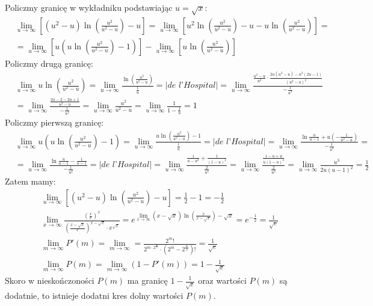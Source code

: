 \documentclass{article}
\begin{document}
Policzmy granicę w wykładniku podstawiając $u = \sqrt{x}$:
\begin{align}
    &\lim_{u\rightarrow \infty} \left[ (u^2-u)\ln{\left(\frac{u^2}{u^2-u}\right)}- u \right] = \lim_{u\rightarrow \infty} \left[ u^2\ln{\left(\frac{u^2}{u^2-u}\right)}- u - u\ln{\left(\frac{u^2}{u^2-u}\right)} \right] = \\
    &= \lim_{u\rightarrow \infty} \left[ u\left(u\ln{\left(\frac{u^2}{u^2-u}\right)}- 1 \right) \right] - \lim_{u\rightarrow \infty} \left[ u\ln{\left(\frac{u^2}{u^2-u}\right)} \right]
\end{align}
Policzmy drugą granicę:
\begin{align}
    &\lim_{u\rightarrow \infty} u\ln{\left(\frac{u^2}{u^2-u}\right)} = \lim_{u\rightarrow \infty} \frac{\ln{\left(\frac{u^2}{u^2-u}\right)}}{\frac{1}{u}} = \bigg| \textit{de l'Hospital} \bigg| = \lim_{u\rightarrow \infty} \frac{\frac{u^2-u}{u^2} \cdot \frac{2u(u^2 - u) - u^2(2u -1)}{(u^2 - u)^2} }{-\frac{1}{u^2}} \\
    &= \lim_{u\rightarrow \infty} \frac{\frac{2u - 2 - 2u +1}{u^2 - u}} {-\frac{1}{u^2}} = \lim_{u\rightarrow \infty} \frac{u^2}{u^2-u} = \lim_{u\rightarrow \infty} \frac{1}{1-\frac{1}{u}} = 1
\end{align}
Policzmy pierwszą granicę:
\begin{align}
    &\lim_{u\rightarrow \infty}  u\left(u\ln{\left(\frac{u^2}{u^2-u}\right)}- 1 \right) = \lim_{u\rightarrow \infty}
    \frac{u\ln{\left(\frac{u^2}{u^2-u}\right)}- 1}{\frac{1}{u}} = \bigg| \textit{de l'Hospital} \bigg| = \lim_{u\rightarrow \infty} \frac{\ln{\frac{u}{u-1}} + u(-\frac{1}{u^2-u})}{-\frac{1}{u^2}} = \\
    &= \lim_{u\rightarrow \infty} \frac{\ln{\frac{u}{u-1}} - \frac{1}{u-1}}{-\frac{1}{u^2}} = \bigg| \textit{de l'Hospital} \bigg| = \lim_{u\rightarrow \infty} \frac{\frac{1}{u-u^2} + \frac{1}{(1-u)^2}}{\frac{2}{u^3}} = \lim_{u\rightarrow \infty} \frac{ \frac{1-u+u}{u(1-u)^2} }{\frac{2}{u^3}} = \lim_{u\rightarrow \infty} \frac{u^3}{2u(u-1)^2} = \frac{1}{2}
\end{align}
Zatem mamy:
\begin{align}
     &\lim_{u\rightarrow \infty} \left[ (u^2-u)\ln{\left(\frac{u^2}{u^2-u}\right)}- u \right] = \frac{1}{2} - 1 = -\frac{1}{2} \\
     &\lim_{x\rightarrow \infty} \frac{(\frac{x}{e})^x}{(\frac{x - \sqrt{x}}{e})^{x-\sqrt{x}} \cdot x^{\sqrt{x}}} = e^{\displaystyle \lim_{x\rightarrow \infty} (x-\sqrt{x})\ln{\left(\frac{x}{x-\sqrt{x}}\right)} - \sqrt{x}} = e^{-\frac{1}{2}} = \frac{1}{\sqrt{e}} \\
     &\lim_{m\rightarrow \infty} P'(m) = \lim_{m\rightarrow \infty} = \frac{2^m!}{2^{m\cdot 2^\frac{m}{2}} \cdot (2^m - 2^\frac{m}{2})!}  = \frac{1}{\sqrt{e}}\\
     &\lim_{m\rightarrow \infty} P(m) = \lim_{m\rightarrow \infty} (1 - P'(m)) = 1 - \frac{1}{\sqrt{e}}
\end{align}
Skoro w nieskończoności $P(m)$ ma granicę $1 - \frac{1}{\sqrt{e}}$ oraz wartości $P(m)$ są dodatnie, to istnieje dodatni kres dolny wartości $P(m)$. 
\end{document}
